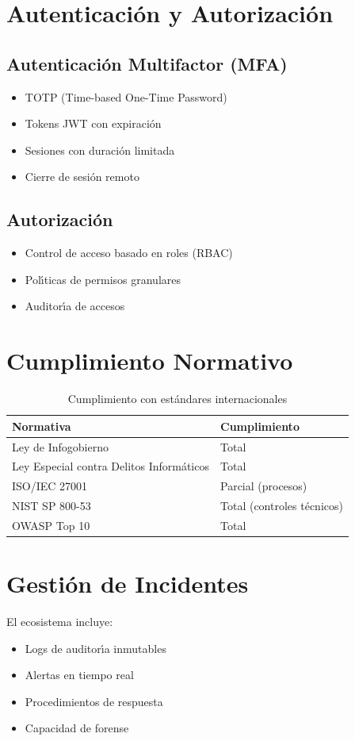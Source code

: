\section{Autenticaci\'on y Autorizaci\'on}

\subsection{Autenticaci\'on Multifactor (MFA)}
\begin{itemize}
\item TOTP (Time-based One-Time Password)
\item Tokens JWT con expiraci\'on
\item Sesiones con duraci\'on limitada
\item Cierre de sesi\'on remoto
\end{itemize}

\subsection{Autorizaci\'on}
\begin{itemize}
\item Control de acceso basado en roles (RBAC)
\item Pol\'{\i}ticas de permisos granulares
\item Auditor\'{\i}a de accesos
\end{itemize}

\section{Cumplimiento Normativo}

\begin{table}[H]
\centering
\caption{Cumplimiento con est\'andares internacionales}
\begin{tabular}{|l|l|}
\hline
\textbf{Normativa} & \textbf{Cumplimiento} \\ \hline
Ley de Infogobierno & Total \\ \hline
Ley Especial contra Delitos Inform\'aticos & Total \\ \hline
ISO/IEC 27001 & Parcial (procesos) \\ \hline
NIST SP 800-53 & Total (controles t\'ecnicos) \\ \hline
OWASP Top 10 & Total \\ \hline
\end{tabular}
\end{table}

\section{Gesti\'on de Incidentes}

El ecosistema incluye:
\begin{itemize}
\item Logs de auditor\'{\i}a inmutables
\item Alertas en tiempo real
\item Procedimientos de respuesta
\item Capacidad de forense
\end{itemize}

\newpage
